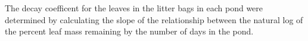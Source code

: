 
The decay coefficent for the leaves in the litter bags in each pond were determined by calculating the slope of the relationship between the natural log of the percent leaf mass remaining by the number of days in the pond.

